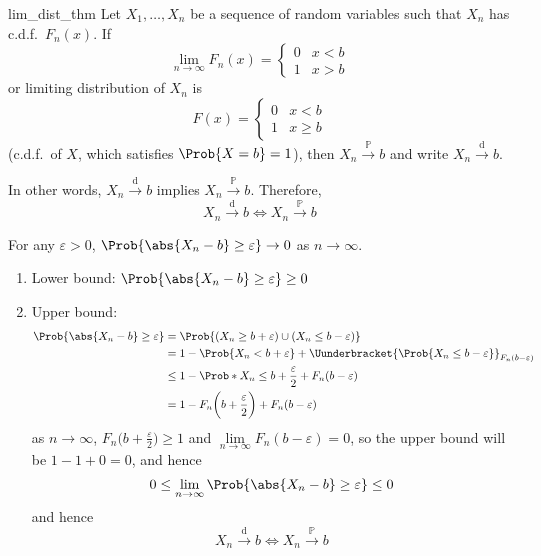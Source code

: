 \begin{Theorem}{}{lim_dist_thm}
    Let $ X_1,\ldots,X_n $ be a sequence of random variables
    such that $ X_n $ has c.d.f.\ $ F_n(x) $. If
    \[ \lim\limits_{{n} \to {\infty}} F_n(x)=\begin{cases}
            0 & x<b \\
            1 & x>b
        \end{cases} \]
    or limiting distribution of $ X_n $ is
    \[ F(x)=\begin{cases}
            0 & x<b    \\
            1 & x\ge b
        \end{cases} \]
    (c.d.f.\ of $ X $, which satisfies $ \Prob{X=b}=1 $), then
    $ X_n\stackrel{\mathbb{P}}{\to}b $ and write
    $ X_n\stackrel{\text{d}}{\to}b $.

    In other words, $ X_n\stackrel{\text{d}}{\to}b $ implies
    $ X_n\stackrel{\mathbb{P}}{\to}b $. Therefore,
    \[ X_n\stackrel{\text{d}}{\to}b\iff X_n\stackrel{\mathbb{P}}{\to}b \]
\end{Theorem}
\begin{Proof}{}{}
    For any $ \varepsilon>0 $, $ \Prob{\abs{X_n-b}\ge \varepsilon}\to 0 $
    as $ n\to\infty $.
    \begin{enumerate}[label=(\roman*)]
        \item Lower bound: $ \Prob{\abs{X_n-b}\ge \varepsilon}\ge 0 $
        \item Upper bound:
              \begin{align*}
                  \Prob{\abs{X_n-b}\ge \varepsilon}
                   & =\Prob{(X_n\ge b+\varepsilon)\cup (X_n\le b-\varepsilon)}       \\
                   & =1-\Prob{X_n<b+\varepsilon}+
                  \Uunderbracket{\Prob{X_n\le b-\varepsilon}}_{F_n(b-\varepsilon)}   \\
                   & \le 1-\Prob*{X_n\le b+\frac{\varepsilon}{2}}+F_n(b-\varepsilon) \\
                   & =1-F_n\biggl(b+\frac{\varepsilon}{2}\biggr)+F_n(b-\varepsilon)
              \end{align*}
              as $ n\to\infty $, $ \displaystyle F_n\biggl(b+\frac{\varepsilon}{2}\biggr)\ge 1 $
              and $ \lim\limits_{{n} \to {\infty}} F_n(b-\varepsilon)=0 $,
              so the upper bound will be $ 1-1+0=0 $, and hence
              \[ 0\le \lim\limits_{{n} \to {\infty}} \Prob{\abs{X_n-b}\ge \varepsilon}
                  \le 0 \]
              and hence
              \[ X_n\stackrel{\text{d}}{\to}b\iff X_n\stackrel{\mathbb{P}}{\to}b \]
    \end{enumerate}
\end{Proof}
